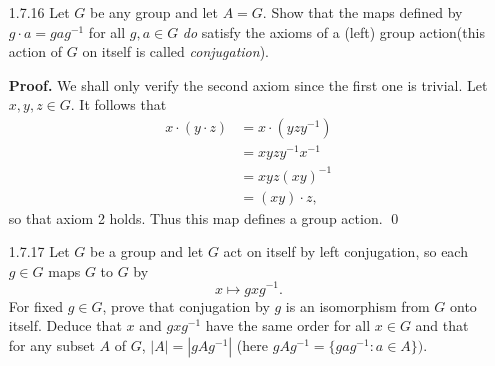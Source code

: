 \begin{enumerate}
      \textbf{Proof.} We shall only verify the second axiom since the first one
      is trivial. Let $x, y, z \in G$. It follows that
      \begin{align*}
         x \cdot (y \cdot z) &= x \cdot (zy^{-1}) \\
            &= zy^{-1}x^{-1} \\
            &= z(xy)^{-1} \\
            &= (xy) \cdot z,
      \end{align*}
      so that axiom 2 holds. Thus this map defines a group action. \qed
   \item[1.7.16]  Let $G$ be any group and let $A = G$. Show that the maps
                  defined by $g \cdot a = gag^{-1}$ for all $g, a \in G$
                  \textit{do} satisfy the axioms of a (left) group action(this
                  action of $G$ on itself is called \textit{conjugation}).

      \textbf{Proof.} We shall only verify the second axiom since the first one
      is trivial. Let $x, y, z \in G$. It follows that
      \begin{align*}
         x \cdot (y \cdot z) &= x \cdot (yzy^{-1}) \\
            &= xyzy^{-1}x^{-1} \\
            &= xyz(xy)^{-1} \\
            &= (xy) \cdot z,
      \end{align*}
      so that axiom 2 holds. Thus this map defines a group action. \qed
   \item[1.7.17]  Let $G$ be a group and let $G$ act on itself by left 
                  conjugation, so each $g \in G$ maps $G$ to $G$ by
                  $$x \mapsto gxg^{-1}.$$
                  For fixed $g \in G$, prove that conjugation by $g$ is an
                  isomorphism from $G$ onto itself. Deduce that $x$ and
                  $gxg^{-1}$ have the same order for all $x \in G$ and that for
                  any subset $A$ of $G$, $|A| = |gAg^{-1}|$ (here
                  $gAg^{-1} = \{gag^{-1} : a \in A\})$.


\end{enumerate}
